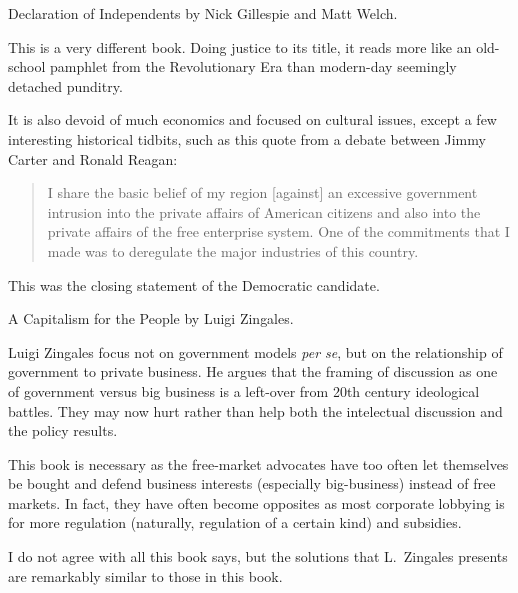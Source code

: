 \book Declaration of Independents by Nick Gillespie and Matt Welch.

This is a very different book. Doing justice to its title, it reads more like
an old-school pamphlet from the Revolutionary Era than modern-day seemingly
detached punditry.

It is also devoid of much economics and focused on cultural issues, except a
few interesting historical tidbits, such as this quote from a debate between
Jimmy Carter and Ronald Reagan:

\begin{quote}
I share the basic belief of my region [against] an excessive government
intrusion into the private affairs of American citizens and also into the
private affairs of the free enterprise system. One of the commitments that I
made was to deregulate the major industries of this country.
\end{quote}

This was the closing statement of the Democratic candidate.

\book A Capitalism for the People by Luigi Zingales.

Luigi Zingales focus not on government models \emph{per se}, but on the
relationship of government to private business. He argues that the framing of
discussion as one of government versus big business is a left-over from 20th
century ideological battles. They may now hurt rather than help both the
intelectual discussion and the policy results.

This book is necessary as the free-market advocates have too often let
themselves be bought and defend business interests (especially big-business)
instead of free markets. In fact, they have often become opposites as most
corporate lobbying is for more regulation (naturally, regulation of a certain
kind) and subsidies.

I do not agree with all this book says, but the solutions that L.\ Zingales
presents are remarkably similar to those in this book.

